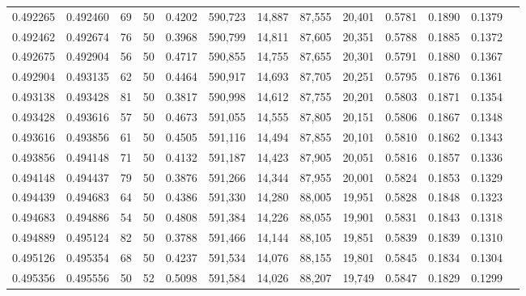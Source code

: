 \begin{tabular}{rrrrrrrrrrrrr}
0.492265 & 0.492460 &    69 &  50 &                                     0.4202 & 590,723 &  14,887 &  87,555 &  20,401 & 0.5781 & 0.1890 & 0.1379 \\
0.492462 & 0.492674 &    76 &  50 &                                     0.3968 & 590,799 &  14,811 &  87,605 &  20,351 & 0.5788 & 0.1885 & 0.1372 \\
0.492675 & 0.492904 &    56 &  50 &                                     0.4717 & 590,855 &  14,755 &  87,655 &  20,301 & 0.5791 & 0.1880 & 0.1367 \\
0.492904 & 0.493135 &    62 &  50 &                                     0.4464 & 590,917 &  14,693 &  87,705 &  20,251 & 0.5795 & 0.1876 & 0.1361 \\
0.493138 & 0.493428 &    81 &  50 &                                     0.3817 & 590,998 &  14,612 &  87,755 &  20,201 & 0.5803 & 0.1871 & 0.1354 \\
0.493428 & 0.493616 &    57 &  50 &                                     0.4673 & 591,055 &  14,555 &  87,805 &  20,151 & 0.5806 & 0.1867 & 0.1348 \\
0.493616 & 0.493856 &    61 &  50 &                                     0.4505 & 591,116 &  14,494 &  87,855 &  20,101 & 0.5810 & 0.1862 & 0.1343 \\
0.493856 & 0.494148 &    71 &  50 &                                     0.4132 & 591,187 &  14,423 &  87,905 &  20,051 & 0.5816 & 0.1857 & 0.1336 \\
0.494148 & 0.494437 &    79 &  50 &                                     0.3876 & 591,266 &  14,344 &  87,955 &  20,001 & 0.5824 & 0.1853 & 0.1329 \\
0.494439 & 0.494683 &    64 &  50 &                                     0.4386 & 591,330 &  14,280 &  88,005 &  19,951 & 0.5828 & 0.1848 & 0.1323 \\
0.494683 & 0.494886 &    54 &  50 &                                     0.4808 & 591,384 &  14,226 &  88,055 &  19,901 & 0.5831 & 0.1843 & 0.1318 \\
0.494889 & 0.495124 &    82 &  50 &                                     0.3788 & 591,466 &  14,144 &  88,105 &  19,851 & 0.5839 & 0.1839 & 0.1310 \\
0.495126 & 0.495354 &    68 &  50 &                                     0.4237 & 591,534 &  14,076 &  88,155 &  19,801 & 0.5845 & 0.1834 & 0.1304 \\
0.495356 & 0.495556 &    50 &  52 &                                     0.5098 & 591,584 &  14,026 &  88,207 &  19,749 & 0.5847 & 0.1829 & 0.1299 \\

\end{tabular}
